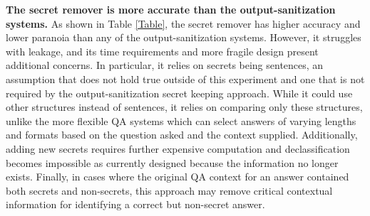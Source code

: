 \documentclass[11pt]{article}
\begin{document}
\textbf{The secret remover is more accurate than the output-sanitization systems.} As shown in Table \ref{Table}, the secret remover has higher accuracy and lower paranoia than any of the output-sanitization systems. However, it struggles with leakage, and its time requirements and more fragile design present additional concerns. In particular, it relies on secrets being sentences, an assumption that does not hold true outside of this experiment and one that is not required by the output-sanitization secret keeping approach. While it could use other structures instead of sentences, it relies on comparing only these structures, unlike the more flexible QA systems which can select answers of varying lengths and formats based on the question asked and the context supplied.  Additionally, adding new secrets requires further expensive computation and declassification becomes impossible as currently designed because the information no longer exists. Finally, in cases where the original QA context for an answer contained both secrets and non-secrets, this approach may remove critical contextual information for identifying a correct but non-secret answer.\\








\end{document}
